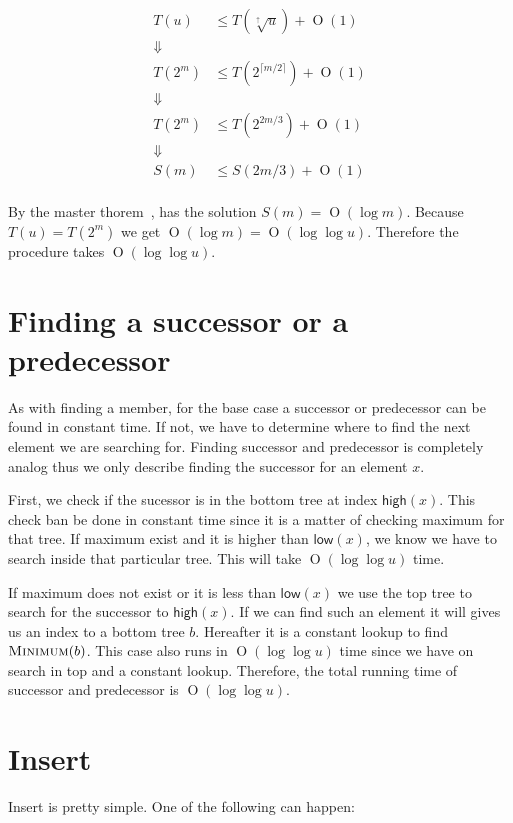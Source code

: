 \documentclass[oneside,11pt,openright]{report}
\newcommand{\BigO}[1]{\ensuremath{\operatorname{O}\left(#1\right)}}
\newcommand{\Minimum}{\textsc{Minimum}}
\newcommand{\HIGH}{\textsf{high}}
\newcommand{\LOW}{\textsf{low}}
\newcommand{\HIGHER}{\sqrt[\uparrow]{u}}
\begin{document}
\begin{align*}
    T(u)  & \leq T(\HIGHER) + \BigO{1} \\
    \Downarrow \\
    T(2^m) & \leq T(2^{\lceil{m/2}\rceil}) + \BigO{1} \\
    \Downarrow \\
    T(2^m) & \leq T(2^{2m/3}) + \BigO{1} \\
    \Downarrow \\
    S(m) & \leq S(2m/3) + \BigO{1} \\
\end{align*}

By the master thorem~\cite[p. 93]{ITA09}, has the solution $S(m) = \BigO{\log m}$. Because $T(u) = T(2^m)$ we get $\BigO{\log m} = \BigO{\log \log u}$. Therefore the procedure takes $\BigO{\log \log u}$.

\section{Finding a successor or a predecessor}

As with finding a member, for the base case a successor or predecessor can be found in constant time. If not, we have to determine where to find the next element we are searching for. Finding successor and predecessor is completely analog thus we only describe finding the successor for an element $x$.

First, we check if the sucessor is in the bottom tree at index $\HIGH(x)$. This check ban be done in constant time since it is a matter of checking maximum for that tree. If maximum exist and it is higher than $\LOW(x)$, we know we have to search inside that particular tree. This will take $\BigO{\log\log u}$ time.

If maximum does not exist or it is less than $\LOW(x)$ we use the top tree to search for the successor to $\HIGH(x)$. If we can find such an element it will gives us an index to a bottom tree $b$. Hereafter it is a constant lookup to find $\Minimum(b)$. This case also runs in $\BigO{\log\log u}$ time since we have on search in top and a constant lookup. Therefore, the total running time of successor and predecessor is $\BigO{\log\log u}$.

\section{Insert}

Insert is pretty simple. One of the following can happen:
\end{document}

